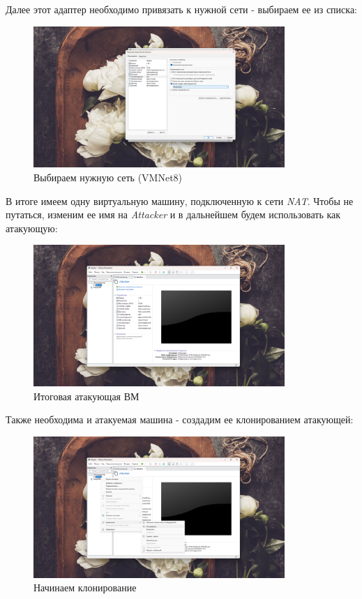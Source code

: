 \documentclass[a4paper]{article}
\begin{document}
  Далее этот адаптер необходимо привязать к нужной сети - выбираем ее из списка:

  \begin{figure}[H]
    \centering
    \includegraphics[width=0.85\textwidth]{03_00 (11)}
    \caption{Выбираем нужную сеть (VMNet8)}
    \label{img:11}
  \end{figure}

  В итоге имеем одну виртуальную машину, подключенную к сети \textit{NAT}.
  Чтобы не путаться, изменим ее имя на \textit{Attacker} и в дальнейшем будем
  использовать как атакующую:

  \begin{figure}[H]
    \centering
    \includegraphics[width=0.85\textwidth]{03_00 (12)}
    \caption{Итоговая атакующая ВМ}
    \label{img:12}
  \end{figure}

  Также необходима и атакуемая машина - создадим ее клонированием атакующей:

  \begin{figure}[H]
    \centering
    \includegraphics[width=0.85\textwidth]{03_00 (13)}
    \caption{Начинаем клонирование}
    \label{img:13}
  \end{figure}
\end{document}
